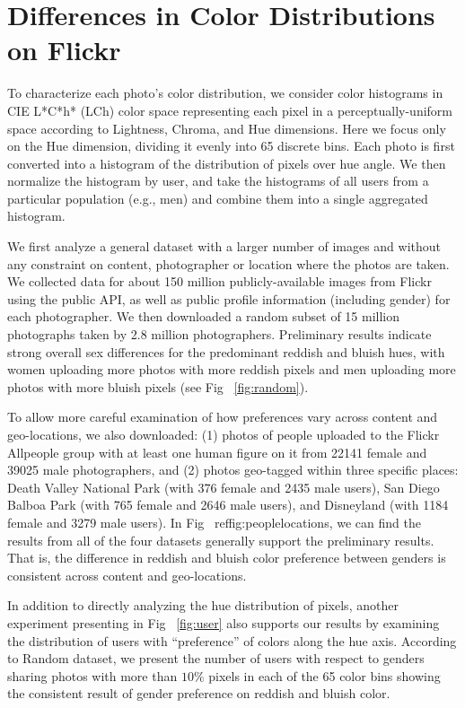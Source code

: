 \section{Differences in Color Distributions on Flickr}
To characterize each photo's color distribution, we consider color histograms in CIE L*C*h* (LCh) color space representing each pixel in a perceptually-uniform space according to Lightness, Chroma, and Hue dimensions.
Here we focus only on the Hue dimension, dividing it evenly into 65 discrete bins.
Each photo is first converted into a histogram of the distribution of pixels over hue angle. We then normalize the histogram by user, and take the histograms of all users from a particular population (e.g., men) and combine them into a single aggregated histogram.

We first analyze a general dataset with a larger number of images and without any constraint on content, photographer or location where the photos are taken.
We collected data for about 150 million publicly-available images from Flickr using the public API, as well as public profile information (including gender) for each photographer. We then downloaded a random subset of 15 million photographs taken by 2.8 million photographers.
Preliminary results indicate strong overall sex differences for the predominant reddish and bluish hues, with women uploading more photos with more reddish pixels and men uploading more photos with more bluish pixels (see Fig ~\ref{fig:random}).  

To allow more careful examination of how preferences vary across content and geo-locations, we also downloaded: (1) photos of people uploaded to the Flickr Allpeople group 
with at least one human figure on it from 22141 female and 39025 male photographers, and (2) photos geo-tagged within three specific places: Death Valley National Park (with 376 female and 2435 male users), San Diego Balboa Park (with 765 female and 2646 male users), and Disneyland (with 1184 female and 3279 male users).
In Fig ~ref{fig:peoplelocations}, we can find the results from all of the four datasets generally support the preliminary results. 
That is, the difference in reddish and bluish color preference between genders is consistent across content and geo-locations.

In addition to directly analyzing the hue distribution of pixels, another experiment presenting in Fig ~\ref{fig:user} also supports our results by examining the distribution of users with ``preference'' of colors along the hue axis.
According to Random dataset, we present the number of users with respect to genders sharing photos with more than $10\%$ pixels in each of the 65 color bins showing the consistent result of gender preference on reddish and bluish color.

